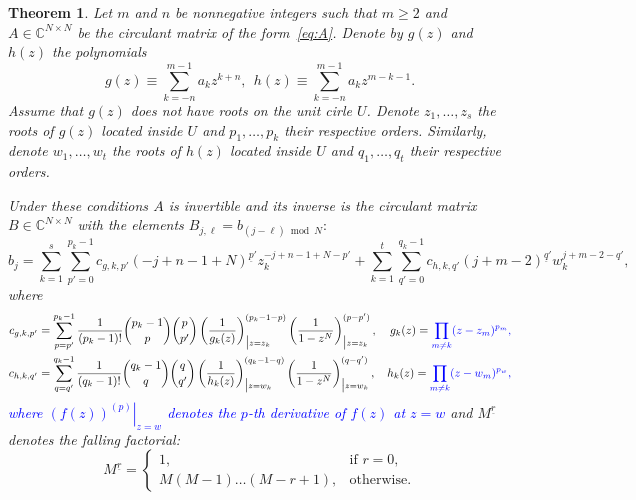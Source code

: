 \documentclass[a4paper]{article}
\newtheorem{theorem}{Theorem}[section]
\begin{document}
	\begin{theorem}\label{thm:general-inverse}
	Let $m$ and $n$ be nonnegative integers such that $m \ge 2$ and $A \in \mathbb{C}^{N\times N}$ be the circulant matrix of the form~\eqref{eq:A}.
	Denote by $g(z)$ and $h(z)$ the polynomials
	\[
	g(z) \equiv \sum_{k=-n}^{m-1}a_{k}z^{k+n},~~h(z) \equiv \sum_{k=-n}^{m-1}a_{k}z^{m-k-1}.
	\]
	Assume that $g(z)$ does not have roots on the unit cirle $U$.
	Denote $z_1, \dots, z_s$ the roots of $g(z)$ located inside $U$ and $p_1, \dots, p_k$ their respective orders.
	Similarly, denote $w_1, \dots, w_t$ the roots of $h(z)$ located inside $U$ and $q_1, \dots, q_t$ their respective orders.
	
	Under these conditions $A$ is invertible and its inverse is the circulant matrix $B\in\mathbb{C}^{N\times N}$ with the elements $B_{j,\ell} = b_{(j-\ell)\bmod N}:$
	\[
	b_j
	=
	\sum_{k=1}^s\sum_{p'=0}^{p_k-1}
	c_{g,k,p'}
	(-j+n-1+N)^{\underline{p}'} z_k^{-j+n-1+N-p'}
	+
	\sum_{k=1}^t\sum_{q'=0}^{q_k-1}
	c_{h,k,q'}
	(j+m-2)^{\underline{q}'}w_k^{j+m-2-q'},
	\]
	where
	\begin{align*}
    c_{g,k,p'}
	    &=
    \sum_{p=p'}^{p_k-1}\frac{1}{(p_k - 1)!}\binom{p_k-1}{p}\binom{p}{p'}
	\left(\frac{1}{g_k(z)}\right)^{(p_k-1-p)}_{\big|{z=z_k}}
	\left(\frac{1}{1-z^{N}}\right)^{(p-p')}_{\big|{z=z_k}},
	&
	g_k(z) = \textcolor{blue}{\prod_{m\neq k} (z-z_m)^{p_m},}
	\\
	c_{h,k,q'}
	    &=
	\sum_{q=q'}^{q_k-1}
	\frac{1}{(q_k - 1)!}\binom{q_k-1}{q}\binom{q}{q'}
	\left(\frac{1}{h_k(z)}\right)^{(q_k-1-q)}_{\big|{z=w_k}}
	\left(\frac{1}{1-z^{N}}\right)^{(q-q')}_{\big|{z=w_k}},
	&
	h_k(z) = \textcolor{blue}{\prod_{m\neq k} (z-w_m)^{p_w},}
	\end{align*}
	\textcolor{blue}{where $\left.(f(z))^{(p)}\right|_{z=w}$ denotes the $p$-th derivative of $f(z)$ at $z=w$}
	and
	$M^{\underline{r}}$ denotes the falling factorial:
	\[
	M^{\underline{r}} = 
	\begin{cases}
	1, & \text{if } r = 0, \\
	M(M-1)\dots(M-r+1), & \text{otherwise}.
	\end{cases}
	\]
	\end{theorem}
	
\end{document}

